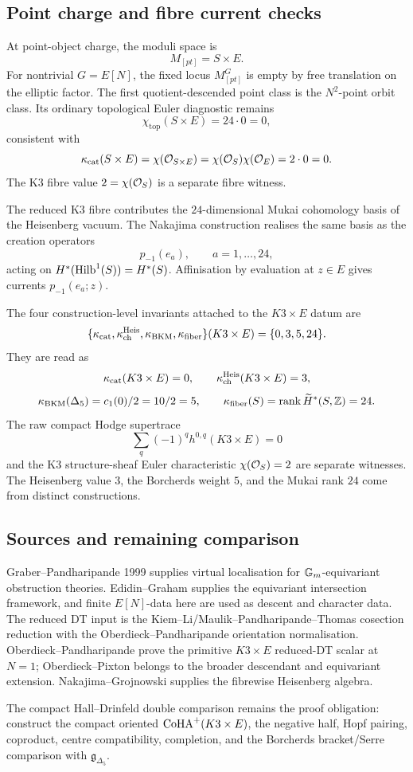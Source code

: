 \subsection*{Point charge and fibre current checks}

At point-object charge, the moduli space is
\[
  M_{[pt]}=S\times E.
\]
For nontrivial \(G=E[N]\), the fixed locus \(M_{[pt]}^G\) is empty by
free translation on the elliptic factor.  The first quotient-descended
point class is the \(N^2\)-point orbit class.  Its ordinary topological
Euler diagnostic remains
\[
  \chi_{\mathrm{top}}(S\times E)=24\cdot0=0,
\]
consistent with
\[
  \kappa_{\mathrm{cat}}(S\times E)=\chi(\mathcal O_{S\times E})
  =
  \chi(\mathcal O_S)\chi(\mathcal O_E)
  =
  2\cdot0
  =
  0.
\]
The K3 fibre value \(2=\chi(\mathcal O_S)\) is a separate fibre witness.

The reduced K3 fibre contributes the \(24\)-dimensional Mukai
cohomology basis of the Heisenberg vacuum.  The Nakajima construction
realises the same basis as the creation operators
\[
  p_{-1}(e_a),\qquad a=1,\ldots,24,
\]
acting on \(H^{*}(\mathrm{Hilb}^1(S))=H^{*}(S)\).  Affinisation by evaluation
at \(z\in E\) gives currents \(p_{-1}(e_a;z)\).

The four construction-level invariants attached to the \(K3\times E\)
datum are
\[
  \{\kappa_{\mathrm{cat}},\kappa_{\mathrm{ch}}^{\mathrm{Heis}},\kappa_{\mathrm{BKM}},\kappa_{\mathrm{fiber}}\}(K3\times E)
  =
  \{0,3,5,24\}.
\]
They are read as
\[
  \kappa_{\mathrm{cat}}(K3\times E)=0,
  \qquad
  \kappa_{\mathrm{ch}}^{\mathrm{Heis}}(K3\times E)=3,
\]
\[
  \kappa_{\mathrm{BKM}}(\Delta_5)=c_1(0)/2=10/2=5,
  \qquad
  \kappa_{\mathrm{fiber}}(S)=\operatorname{rank}\widetilde H^{*}(S,\mathbb Z)=24.
\]
The raw compact Hodge supertrace
\[
  \sum_q(-1)^qh^{0,q}(K3\times E)=0
\]
and the K3 structure-sheaf Euler characteristic \(\chi(\mathcal O_S)=2\) are
separate witnesses.  The Heisenberg value \(3\), the Borcherds weight
\(5\), and the Mukai rank \(24\) come from distinct constructions.

\subsection*{Sources and remaining comparison}

Graber--Pandharipande 1999 supplies virtual localisation for
\(\mathbb G_m\)-equivariant obstruction theories.  Edidin--Graham supplies the
equivariant intersection framework, and finite \(E[N]\)-data here are
used as descent and character data.  The reduced DT input is the
Kiem--Li/Maulik--Pandharipande--Thomas cosection reduction with the
Oberdieck--Pandharipande orientation normalisation.
Oberdieck--Pandharipande prove the primitive \(K3\times E\)
reduced-DT scalar at \(N=1\); Oberdieck--Pixton belongs to the broader
descendant and equivariant extension.  Nakajima--Grojnowski supplies the
fibrewise Heisenberg algebra.

The compact Hall--Drinfeld double comparison remains the proof
obligation: construct the compact oriented \(\mathrm{CoHA}^{+}(K3\times E)\),
the negative half, Hopf pairing, coproduct, centre compatibility,
completion, and the Borcherds bracket/Serre comparison with
\(\mathfrak g_{\Delta_5}\).
